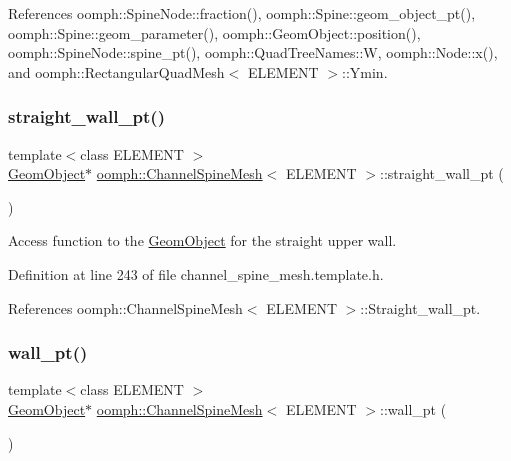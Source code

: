 References oomph\+::\+Spine\+Node\+::fraction(), oomph\+::\+Spine\+::geom\+\_\+object\+\_\+pt(), oomph\+::\+Spine\+::geom\+\_\+parameter(), oomph\+::\+Geom\+Object\+::position(), oomph\+::\+Spine\+Node\+::spine\+\_\+pt(), oomph\+::\+Quad\+Tree\+Names\+::W, oomph\+::\+Node\+::x(), and oomph\+::\+Rectangular\+Quad\+Mesh$<$ E\+L\+E\+M\+E\+N\+T $>$\+::\+Ymin.

\mbox{\label{classoomph_1_1ChannelSpineMesh_a54818e02db7026d39451f5f502e1cf11}} 
\subsubsection{\texorpdfstring{straight\+\_\+wall\+\_\+pt()}{straight\_wall\_pt()}}
{\footnotesize\ttfamily template$<$class E\+L\+E\+M\+E\+NT $>$ \\
\hyperlink{classoomph_1_1GeomObject}{Geom\+Object}$\ast$ \hyperlink{classoomph_1_1ChannelSpineMesh}{oomph\+::\+Channel\+Spine\+Mesh}$<$ E\+L\+E\+M\+E\+NT $>$\+::straight\+\_\+wall\+\_\+pt (\begin{DoxyParamCaption}{ }\end{DoxyParamCaption})\hspace{0.3cm}{\ttfamily [inline]}}



Access function to the \hyperlink{classoomph_1_1GeomObject}{Geom\+Object} for the straight upper wall. 



Definition at line 243 of file channel\+\_\+spine\+\_\+mesh.\+template.\+h.



References oomph\+::\+Channel\+Spine\+Mesh$<$ E\+L\+E\+M\+E\+N\+T $>$\+::\+Straight\+\_\+wall\+\_\+pt.

\mbox{\label{classoomph_1_1ChannelSpineMesh_a741893ef460f1275f1df43496bb7536c}} 
\subsubsection{\texorpdfstring{wall\+\_\+pt()}{wall\_pt()}}
{\footnotesize\ttfamily template$<$class E\+L\+E\+M\+E\+NT $>$ \\
\hyperlink{classoomph_1_1GeomObject}{Geom\+Object}$\ast$ \hyperlink{classoomph_1_1ChannelSpineMesh}{oomph\+::\+Channel\+Spine\+Mesh}$<$ E\+L\+E\+M\+E\+NT $>$\+::wall\+\_\+pt (\begin{DoxyParamCaption}{ }\end{DoxyParamCaption})\hspace{0.3cm}{\ttfamily [inline]}}




